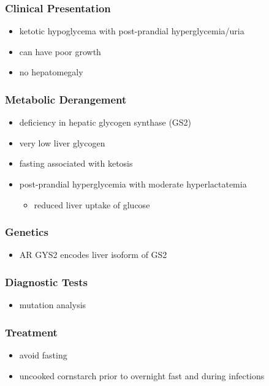 \documentclass{scrartcl}
\begin{document}
\subsubsection{Clinical Presentation}
\label{sec:org2f90efe}
\begin{itemize}
\item ketotic hypoglycema with post-prandial hyperglycemia/uria
\item can have poor growth
\item no hepatomegaly
\end{itemize}
\subsubsection{Metabolic Derangement}
\label{sec:org3e8581c}
\begin{itemize}
\item deficiency in hepatic glycogen synthase (GS2)
\item very low liver glycogen
\item fasting associated with ketosis
\item post-prandial hyperglycemia with moderate hyperlactatemia
\begin{itemize}
\item reduced liver uptake of glucose
\end{itemize}
\end{itemize}

\subsubsection{Genetics}
\label{sec:org27c260b}
\begin{itemize}
\item AR GYS2 encodes liver isoform of GS2
\end{itemize}

\subsubsection{Diagnostic Tests}
\label{sec:org88db56c}
\begin{itemize}
\item mutation analysis
\end{itemize}
\subsubsection{Treatment}
\label{sec:org5af84bf}
\begin{itemize}
\item avoid fasting
\item uncooked cornstarch prior to overnight fast and during infections
\end{itemize}
\end{document}

